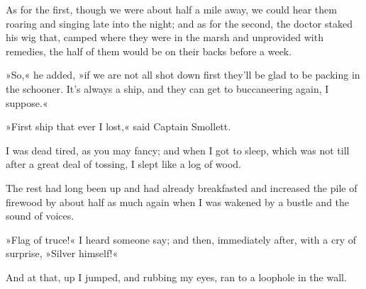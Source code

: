 As for the first, though we were about half a mile away, we could hear them roaring and singing late into the night; and as for the second, the doctor staked his wig that, camped where they were in the marsh and unprovided with remedies, the half of them would be on their backs before a week.

»So,« he added, »if we are not all shot down first they'll be glad to be packing in the schooner. It's always a ship, and they can get to buccaneering again, I suppose.«

»First ship that ever I lost,« said Captain Smollett.

I was dead tired, as you may fancy; and when I got to sleep, which was not till after a great deal of tossing, I slept like a log of wood.

The rest had long been up and had already breakfasted and increased the pile of firewood by about half as much again when I was wakened by a bustle and the sound of voices.

»Flag of truce!« I heard someone say; and then, immediately after, with a cry of surprise, »Silver himself!«

And at that, up I jumped, and rubbing my eyes, ran to a loophole in the wall.